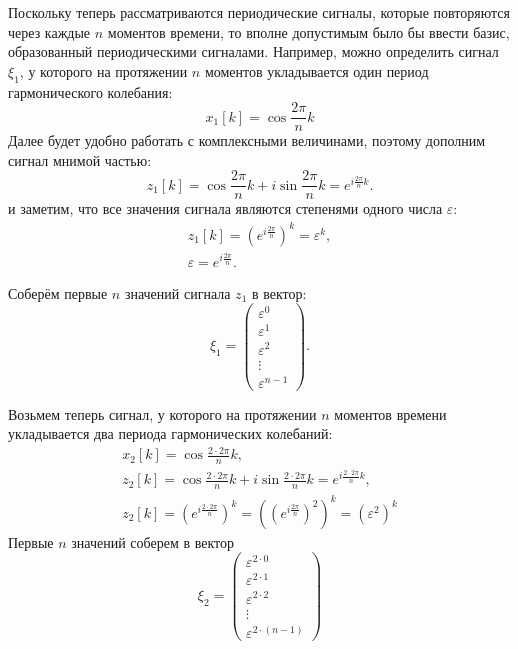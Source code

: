 Поскольку теперь рассматриваются периодические сигналы, которые повторяются через каждые $n$ моментов времени, то вполне допустимым было бы ввести базис, образованный периодическими
сигналами. Например, можно определить сигнал $\xi_1$, у которого на протяжении $n$ моментов укладывается один период гармонического колебания:
\[
    x_1[k]
    = \cos \frac{2 \pi}{n} k
\]
Далее будет удобно работать с комплексными величинами, поэтому дополним сигнал мнимой частью:
\[
    z_1[k]
    = \cos \frac{2 \pi}{n} k + i \sin \frac{2 \pi}{n} k
    = e^{i \frac{2 \pi}{n} k} .
\]
и заметим, что все значения сигнала являются степенями одного числа $\varepsilon$:
\begin{gather*}
    z_1[k]
    = \left( e^{i \frac{2 \pi}{n}} \right)^k
    = \varepsilon^k, \\
    \varepsilon = e^{i \frac{2 \pi}{n}} .
\end{gather*}

Соберём первые $n$ значений сигнала $z_1$ в вектор:
\[
    \xi_1
    = \begin{pmatrix}
        \varepsilon^0 \\
        \varepsilon^1 \\
        \varepsilon^2 \\
        \vdots        \\
        \varepsilon^{n-1}
    \end{pmatrix} .
\]

Возьмем теперь сигнал, у которого на протяжении $n$ моментов времени укладывается два периода гармонических колебаний:
\begin{gather*}
    x_2[k]
    = \cos \frac{2 \cdot 2 \pi}{n} k , \\
    z_2[k]
    = \cos \frac{2 \cdot 2 \pi}{n} k + i \sin \frac{2 \cdot 2 \pi}{n} k
    = e^{i \frac{2 \cdot 2 \pi}{n} k}, \\
    z_2[k]
    = \left( e^{i \frac{2 \cdot 2 \pi}{n}} \right)^k
    = \left( \left( e^{i \frac{2 \pi}{n}} \right)^2 \right)^k
    = \left( \varepsilon^2 \right)^k
\end{gather*}
Первые $n$ значений соберем в вектор
\[
    \xi_2
    = \begin{pmatrix}
        \varepsilon^{2 \cdot 0} \\
        \varepsilon^{2 \cdot 1} \\
        \varepsilon^{2 \cdot 2} \\
        \vdots                  \\
        \varepsilon^{2 \cdot (n-1)}
    \end{pmatrix}
\]

